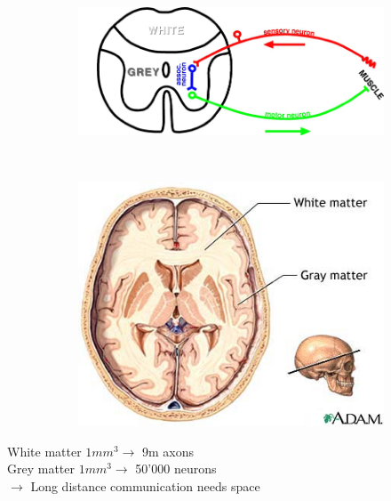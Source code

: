 \documentclass[english,11pt]{article}
\begin{document}
\begin{figure}[H]
        \centering
        \begin{subfigure}[b]{0.5\textwidth}
                \centering
				\includegraphics[width=\textwidth]{motor-sensory-neuron.png}
        \end{subfigure}%
        ~
        \begin{subfigure}[b]{0.5\textwidth}
                \centering
				\includegraphics[width=\textwidth]{brain-cut.png}
        \end{subfigure}
\end{figure}
White matter $1mm^3\rightarrow$ 9m axons\\
Grey matter $1mm^3\rightarrow$ 50'000 neurons\\
$\rightarrow$ Long distance communication needs space
\end{document}
